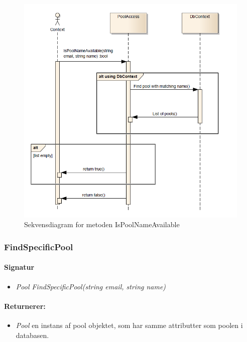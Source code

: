 \begin{figure}
\centering
\includegraphics[width=0.9\linewidth]{figs/dbSeq/isPoolNameAvailable}
\caption{Sekvensdiagram for metoden IsPoolNameAvailable}
\label{fig:isPoolNameAvailable}
\end{figure}



\subsubsection{FindSpecificPool}%





\paragraph{Signatur}
\begin{itemize}
	\item \textit{Pool FindSpecificPool(string email, string name)}
\end{itemize}

\paragraph{Returnerer:}
\begin{itemize}
	\item \textit{Pool} en instans af pool objektet, som har samme attributter som poolen i databasen.
\end{itemize}

